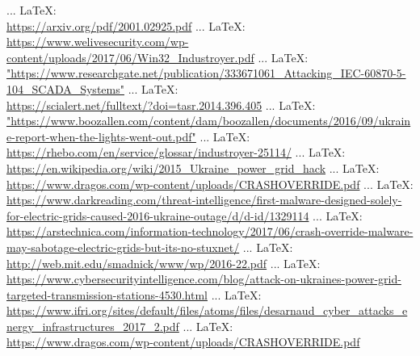 \begin{thebibliography}{99}
{{{{				 ... \LaTeX:\\ \url{https://arxiv.org/pdf/2001.02925.pdf}
				 ... \LaTeX:\\ \url{https://www.welivesecurity.com/wp-content/uploads/2017/06/Win32_Industroyer.pdf}
				 ... \LaTeX:\\ \url{"https://www.researchgate.net/publication/333671061_Attacking_IEC-60870-5-104_SCADA_Systems"}
				 ... \LaTeX:\\ \url{https://scialert.net/fulltext/?doi=tasr.2014.396.405}
				 ... \LaTeX:\\ \url{"https://www.boozallen.com/content/dam/boozallen/documents/2016/09/ukraine-report-when-the-lights-went-out.pdf"}
				 ... \LaTeX:\\ \url{https://rhebo.com/en/service/glossar/industroyer-25114/}
				 ... \LaTeX:\\ \url{https://en.wikipedia.org/wiki/2015_Ukraine_power_grid_hack}
				 ... \LaTeX:\\ \url{https://www.dragos.com/wp-content/uploads/CRASHOVERRIDE.pdf}
				 ... \LaTeX:\\ \url{https://www.darkreading.com/threat-intelligence/first-malware-designed-solely-for-electric-grids-caused-2016-ukraine-outage/d/d-id/1329114}
				 ... \LaTeX:\\ \url{https://arstechnica.com/information-technology/2017/06/crash-override-malware-may-sabotage-electric-grids-but-its-no-stuxnet/}
				 ... \LaTeX:\\ \url{http://web.mit.edu/smadnick/www/wp/2016-22.pdf}
				 ... \LaTeX:\\ \url{https://www.cybersecurityintelligence.com/blog/attack-on-ukraines-power-grid-targeted-transmission-stations-4530.html}
				 ... \LaTeX:\\ \url{https://www.ifri.org/sites/default/files/atoms/files/desarnaud_cyber_attacks_energy_infrastructures_2017_2.pdf}
				 ... \LaTeX:\\ \url{https://www.dragos.com/wp-content/uploads/CRASHOVERRIDE.pdf}
}}}}
\end{thebibliography}
